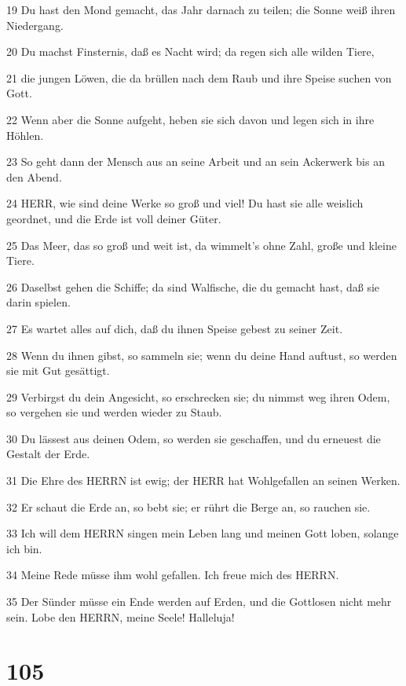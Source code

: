 \par 19 Du hast den Mond gemacht, das Jahr darnach zu teilen; die Sonne weiß ihren Niedergang.
\par 20 Du machst Finsternis, daß es Nacht wird; da regen sich alle wilden Tiere,
\par 21 die jungen Löwen, die da brüllen nach dem Raub und ihre Speise suchen von Gott.
\par 22 Wenn aber die Sonne aufgeht, heben sie sich davon und legen sich in ihre Höhlen.
\par 23 So geht dann der Mensch aus an seine Arbeit und an sein Ackerwerk bis an den Abend.
\par 24 HERR, wie sind deine Werke so groß und viel! Du hast sie alle weislich geordnet, und die Erde ist voll deiner Güter.
\par 25 Das Meer, das so groß und weit ist, da wimmelt's ohne Zahl, große und kleine Tiere.
\par 26 Daselbst gehen die Schiffe; da sind Walfische, die du gemacht hast, daß sie darin spielen.
\par 27 Es wartet alles auf dich, daß du ihnen Speise gebest zu seiner Zeit.
\par 28 Wenn du ihnen gibst, so sammeln sie; wenn du deine Hand auftust, so werden sie mit Gut gesättigt.
\par 29 Verbirgst du dein Angesicht, so erschrecken sie; du nimmst weg ihren Odem, so vergehen sie und werden wieder zu Staub.
\par 30 Du lässest aus deinen Odem, so werden sie geschaffen, und du erneuest die Gestalt der Erde.
\par 31 Die Ehre des HERRN ist ewig; der HERR hat Wohlgefallen an seinen Werken.
\par 32 Er schaut die Erde an, so bebt sie; er rührt die Berge an, so rauchen sie.
\par 33 Ich will dem HERRN singen mein Leben lang und meinen Gott loben, solange ich bin.
\par 34 Meine Rede müsse ihm wohl gefallen. Ich freue mich des HERRN.
\par 35 Der Sünder müsse ein Ende werden auf Erden, und die Gottlosen nicht mehr sein. Lobe den HERRN, meine Seele! Halleluja!

\chapter{105}

